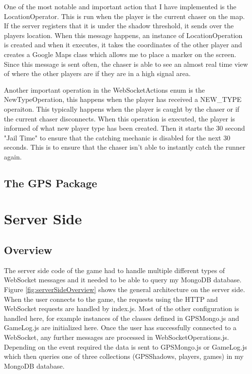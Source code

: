 \documentclass{l4proj}
\begin{document}
One of the most notable and important action that I have implemented is the LocationOperator. This is run when the player
is the current chaser on the map. If the server registers that it is under the shadow threshold, it sends over the
players location. When this message happens, an instance of LocationOperation is created and when it executes, it
takes the coordinates of the other player and creates a Google Maps class which allows me to place a marker on the
screen. Since this message is sent often, the chaser is able to see an almost real time view of where the other players
are if they are in a high signal area.

Another important operation in the WebSocketActions enum is the NewTypeOperation, this happens when the player has received
a NEW_TYPE operaiton. This typically happens when the player is caught by the chaser or if the current chaser disconnects.
When this operation is executed, the player is informed of what new player type has been created. Then it starts the 30
second "Jail Time" to ensure that the catching mechanic is disabled for the next 30 seconds. This is to ensure that the
chaser isn't able to instantly catch the runner again.



\subsection{The GPS Package}

\section{Server Side}
\label{serverside_imp}

\subsection{Overview}
\label{serverOverview}
The server side code of the game had to handle multiple different types of WebSocket messages and it needed
to be able to query my MongoDB database. Figure \ref{fig:serverSideOverview} shows the general architecture
on the server side. When the user connects to the game, the requests using the HTTP and WebSocket requests
are handled by index.js. Most of the other configuration is handled here, for example instances of the classes
defined in GPSMongo.js and GameLog.js are initialized here. Once the user has successfully connected to a WebSocket,
any further messages are processed in WebSocketOperations.js. Depending on the event required the data is sent
to GPSMongo.js or GameLog.js which then queries one of three collections (GPSShadows, players, games) in my MongoDB database.
\end{document}
